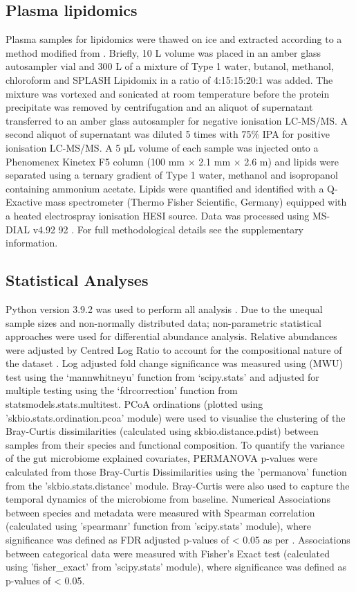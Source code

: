 \documentclass{article}
\begin{document}
\subsection*{Plasma lipidomics}
Plasma samples for lipidomics were thawed on ice and extracted according to a method modified from \citet{liu2016plasma}.
Briefly, 10 \textmu{}L volume was placed in an amber glass autosampler vial and 300 \textmu{}L of a mixture of Type 1 water, butanol, methanol, chloroform and SPLASH Lipidomix in a ratio of 4:15:15:20:1 was added.
The mixture was vortexed and sonicated at room temperature before the protein precipitate was removed by centrifugation and an aliquot of supernatant transferred to an amber glass autosampler for negative ionisation LC-MS/MS.
A second aliquot of supernatant was diluted 5 times with 75\% IPA for positive ionisation LC-MS/MS.
A 5 µL volume of each sample was injected onto a Phenomenex Kinetex F5 column (100 mm × 2.1 mm × 2.6 \textmu{}m) and lipids were separated using a ternary gradient of Type 1 water, methanol and isopropanol containing ammonium acetate.
Lipids were quantified and identified with a Q-Exactive mass spectrometer (Thermo Fisher Scientific, Germany) equipped with a heated electrospray ionisation HESI source.
Data was processed using MS-DIAL v4.92 92 \cite{tsugawa2015ms}.
For full methodological details see the supplementary information.

\subsection*{Statistical Analyses}
Python version 3.9.2 was used to perform all analysis \cite{van1995python}.
Due to the unequal sample sizes and non-normally distributed data; non-parametric statistical approaches were used for differential abundance analysis.
Relative abundances were adjusted by Centred Log Ratio to account for the compositional nature of the dataset \cite{gloor2016s}.
Log adjusted fold change significance was measured using (\gls{MWU}) test using the ‘mannwhitneyu’ function from ‘scipy.stats’ and adjusted for multiple testing using the ‘fdrcorrection’ function from statsmodels.stats.multitest.
\gls{PCoA} ordinations (plotted using 'skbio.stats.ordination.pcoa' module) were used to visualise the clustering of the Bray-Curtis dissimilarities (calculated using skbio.distance.pdist) between samples from their species and functional composition.
To quantify the variance of the gut microbiome explained covariates, \gls{PERMANOVA} p-values were calculated from those Bray-Curtis Dissimilarities using the ’permanova’ function from the 'skbio.stats.distance' module.
Bray-Curtis were also used to capture the temporal dynamics of the microbiome from baseline.
Numerical Associations between species and metadata were measured with Spearman correlation (calculated using 'spearmanr' function from 'scipy.stats' module), where significance was defined as \gls{FDR} adjusted p-values of \textless{} 0.05 as per \citet{2020SciPyNMeth}.
Associations between categorical data were measured with Fisher's Exact test (calculated using 'fisher\_exact' from 'scipy.stats' module), where significance was defined as p-values of \textless{} 0.05.
\end{document}
